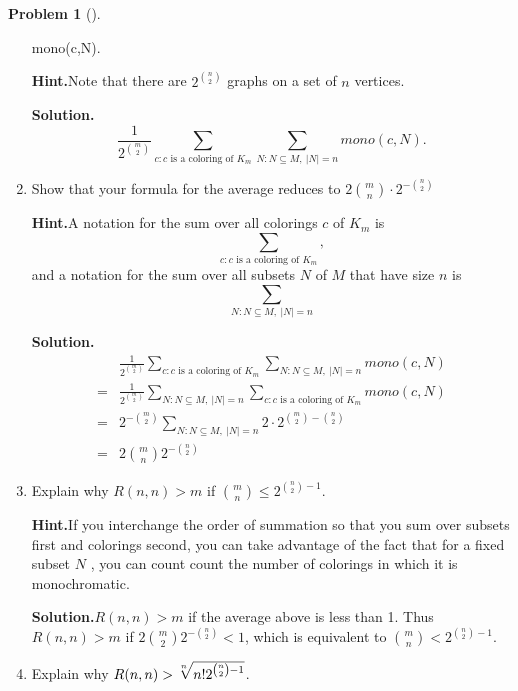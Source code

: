 \documentclass[10pt,]{book}
\theoremstyle{plain}
\theoremstyle{definition}
\newtheorem{activity}[project]{Problem}
\theoremstyle{definition}
\numberwithin{equation}{chapter}
\newcommand{\lt}{<}
\newcommand{\amp}{&}
\begin{document}
\begin{activity}[]
\begin{enumerate}[font=\bfseries,label=(\alph*),ref=\alph*]
{mono}(c,N)\).%
\par\medskip\noindent%
\textbf{Hint.}\quad Note that there are \(2^{\binom{n}{2}}\) graphs on a set of \(n\) vertices.%
\par\medskip\noindent%
\textbf{Solution.}\quad %
\begin{equation*}
\frac{1}{2^{\binom{m}{2}}}\sum_{c:c\mbox{~is a coloring
of~} K_m}\sum_{N:N\subseteq M,~|N|=n}{ mono}(c,N).
\end{equation*}
%
\item\label{task-79} Show that your formula for the average reduces to \(2\binom{m}{n}\cdot2^{-\binom{n}{2}}\)%
\par\medskip\noindent%
\textbf{Hint.}\quad A notation for the sum over all colorings \(c\) of \(K_m\) is%
\begin{equation*}
\sum_{c:c\mbox{~is a coloring of~} K_m},
\end{equation*}
and a notation for the sum over all subsets \(N\) of \(M\) that have size \(n\) is%
\begin{equation*}
\sum_{N:N\subseteq M,~|N|=n}
\end{equation*}
%
\par\medskip\noindent%
\textbf{Solution.}\quad %
\begin{align*}
\amp \frac{1}{2^{\binom{m}{2}}}\sum_{c:c\mbox{~is a coloring
of~} K_m}\sum_{N:N\subseteq M,~|N|=n}{ mono}(c,N)\\
=\amp \frac{1}{2^{\binom{m}{2}}} \sum_{N:N\subseteq
M,~|N|=n}\sum_{c:c\mbox{~is a coloring of~} K_m}{ mono}(c,N)\\
=\amp
2^{-\binom{m}{2}}\sum_{N:N\subseteq
M,~|N|=n}2\cdot2^{\binom{m}{2}-\binom{n}{2}}\\
=\amp  2\binom{m}{n}2^{-\binom{n}{2}}
\end{align*}
%
\item\label{task-80} Explain why \(R(n,n)>m\) if \(\binom{m}{n}\le 2^{\binom{n}{2} -1}\).%
\par\medskip\noindent%
\textbf{Hint.}\quad If you interchange the order of summation so that you sum over subsets first and colorings second, you can take advantage of the fact that for a fixed subset \(N\) , you can count count the number of colorings in which it is monochromatic.%
\par\medskip\noindent%
\textbf{Solution.}\quad \(R(n,n)>m\) if the average above is less than 1. Thus \(R(n,n)>m\) if \(2\binom{m}{2}2^{-\binom{n}{2}}\lt 1\), which is equivalent to \(\binom{m}{n}\lt 2^{\binom{n}{2}-1}\).%
\item\label{task-81} Explain why \(R(n,n)>\root n \of {n!2^{\binom{n}{2}-1}}\).%

\end{enumerate}
\end{activity}
\end{document}

